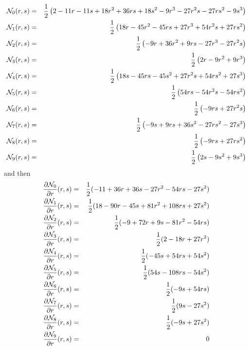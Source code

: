 \begin{eqnarray}
{\mathcal{N}}_0(r,s) &=& \frac12\left(2-11r-11s+18r^2+36rs+18s^2-9r^3-27r^2s-27rs^2-9s^3 \right)   \nonumber\\
{\mathcal{N}}_1(r,s)&=& \frac12\left(18r-45r^2-45rs +27r^3 +54r^2s+27rs^2\right)   \nonumber\\
{\mathcal{N}}_2(r,s)&=& \frac12\left( -9r+36r^2+9rs -27r^3 -27r^2s \right)   \nonumber\\
{\mathcal{N}}_3(r,s)&=& \frac12\left( 2r-9r^2+9r^3 \right)   \nonumber\\
{\mathcal{N}}_4(r,s)&=& \frac12\left( 18s -45rs-45s^2+27r^2s+54rs^2+27s^3\right) \nonumber\\
{\mathcal{N}}_5(r,s)&=& \frac12\left( 54rs-54r^2s-54rs^2  \right)   \nonumber\\
{\mathcal{N}}_6(r,s)&=& \frac12\left( -9rs+27r^2s  \right)   \nonumber\\
{\mathcal{N}}_7(r,s)&=& \frac12\left( -9s+9rs+36s^2-27rs^2-27s^3\right)\nonumber\\
{\mathcal{N}}_8(r,s)&=& \frac12\left( -9rs+27rs^2  \right)   \nonumber\\
{\mathcal{N}}_9(r,s)&=& \frac12\left( 2s-9s^2+9s^3  \right)   
\end{eqnarray}
and then
\begin{eqnarray}
\frac{\partial{\mathcal{N}}_0}{\partial r} (r,s) &=& \frac12(-11+36r+36s-27r^2-54rs-27s^2)   \nonumber\\
\frac{\partial{\mathcal{N}}_1}{\partial r} (r,s) &=& \frac12(18-90r-45s+81r^2+108rs+27s^2)   \nonumber\\
\frac{\partial{\mathcal{N}}_2}{\partial r} (r,s) &=& \frac12(-9+72r+9s-81r^2-54rs)   \nonumber\\
\frac{\partial{\mathcal{N}}_3}{\partial r} (r,s) &=& \frac12(2-18r+27r^2)   \nonumber\\
\frac{\partial{\mathcal{N}}_4}{\partial r} (r,s) &=& \frac12(-45s+54rs+54s^2)   \nonumber\\
\frac{\partial{\mathcal{N}}_5}{\partial r} (r,s) &=& \frac12(54s-108rs-54s^2) \nonumber\\
\frac{\partial{\mathcal{N}}_6}{\partial r} (r,s) &=& \frac12(-9s+54rs) \nonumber\\
\frac{\partial{\mathcal{N}}_7}{\partial r} (r,s) &=& \frac12(9s-27s^2) \nonumber\\
\frac{\partial{\mathcal{N}}_8}{\partial r} (r,s) &=& \frac12(-9s+27s^2)\nonumber\\
\frac{\partial{\mathcal{N}}_9}{\partial r} (r,s) &=&  0  \nonumber
\end{eqnarray}

